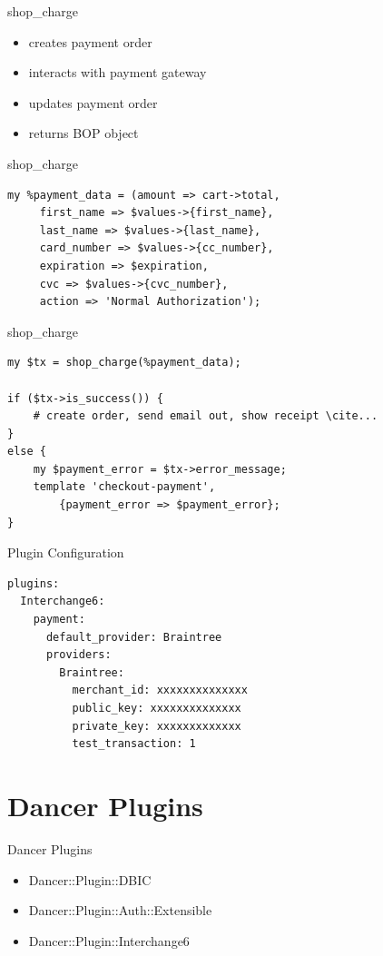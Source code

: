 \begin{frame}{shop\_charge}
\begin{itemize}
\item creates payment order
\item interacts with payment gateway
\item updates payment order
\item returns BOP object
\end{itemize}
\end{frame}

\begin{frame}[fragile]{shop\_charge}
\begin{lstlisting}
my %payment_data = (amount => cart->total,
     first_name => $values->{first_name},
     last_name => $values->{last_name},
     card_number => $values->{cc_number},
     expiration => $expiration,
     cvc => $values->{cvc_number},
     action => 'Normal Authorization');
\end{lstlisting}
\end{frame}

\begin{frame}[fragile]{shop\_charge}
\begin{lstlisting}
my $tx = shop_charge(%payment_data);

if ($tx->is_success()) {
    # create order, send email out, show receipt \cite...
}
else {
    my $payment_error = $tx->error_message;
    template 'checkout-payment', 
        {payment_error => $payment_error};
}
\end{lstlisting}
\end{frame}

\begin{frame}[fragile]{Plugin Configuration}
\begin{lstlisting}
plugins:
  Interchange6:
    payment:
      default_provider: Braintree
      providers:
        Braintree:
          merchant_id: xxxxxxxxxxxxxx
          public_key: xxxxxxxxxxxxxx
          private_key: xxxxxxxxxxxxx
          test_transaction: 1
\end{lstlisting}
\end{frame}

\section{Dancer Plugins}
\begin{frame}{Dancer Plugins}
\begin{itemize}
\item Dancer::Plugin::DBIC
\item Dancer::Plugin::Auth::Extensible
\item Dancer::Plugin::Interchange6
\end{itemize}
\end{frame}

